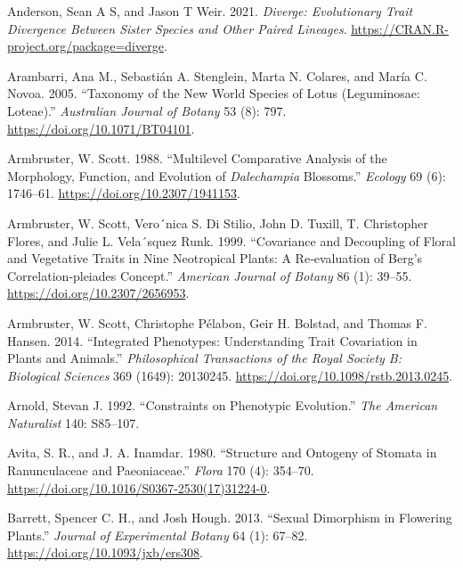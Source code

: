 \documentclass[
  12pt,
]{article}
\newlength{\cslhangindent}
\newlength{\cslentryspacingunit} %
\newenvironment{CSLReferences}[2] %
 {%
  \setlength{\parindent}{0pt}
  \ifodd #1
  \let\oldpar\par
  \def\par{\hangindent=\cslhangindent\oldpar}
  \fi
  \setlength{\parskip}{#2\cslentryspacingunit}
 }%
 {}
\begin{document}
\hypertarget{refs}{}
\begin{CSLReferences}{1}{0}
\leavevmode{}%
Anderson, Sean A S, and Jason T Weir. 2021. \emph{Diverge: {Evolutionary} {Trait} {Divergence} {Between} {Sister} {Species} and {Other} {Paired} {Lineages}}. \url{https://CRAN.R-project.org/package=diverge}.

\leavevmode{}%
Arambarri, Ana M., Sebastián A. Stenglein, Marta N. Colares, and María C. Novoa. 2005. {``Taxonomy of the {New} {World} Species of {Lotus} ({Leguminosae}: {Loteae}).''} \emph{Australian Journal of Botany} 53 (8): 797. \url{https://doi.org/10.1071/BT04101}.

\leavevmode{}%
Armbruster, W. Scott. 1988. {``Multilevel {Comparative} {Analysis} of the {Morphology}, {Function}, and {Evolution} of \emph{Dalechampia} {Blossoms}.''} \emph{Ecology} 69 (6): 1746--61. \url{https://doi.org/10.2307/1941153}.

\leavevmode{}%
Armbruster, W. Scott, Vero´nica S. Di Stilio, John D. Tuxill, T. Christopher Flores, and Julie L. Vela´squez Runk. 1999. {``Covariance and Decoupling of Floral and Vegetative Traits in Nine {Neotropical} Plants: A Re‐evaluation of {Berg}'s Correlation‐pleiades Concept.''} \emph{American Journal of Botany} 86 (1): 39--55. \url{https://doi.org/10.2307/2656953}.

\leavevmode{}%
Armbruster, W. Scott, Christophe Pélabon, Geir H. Bolstad, and Thomas F. Hansen. 2014. {``Integrated Phenotypes: Understanding Trait Covariation in Plants and Animals.''} \emph{Philosophical Transactions of the Royal Society B: Biological Sciences} 369 (1649): 20130245. \url{https://doi.org/10.1098/rstb.2013.0245}.

\leavevmode{}%
Arnold, Stevan J. 1992. {``Constraints on Phenotypic Evolution.''} \emph{The American Naturalist} 140: S85--107.

\leavevmode{}%
Avita, S. R., and J. A. Inamdar. 1980. {``Structure and {Ontogeny} of {Stomata} in {Ranunculaceae} and {Paeoniaceae}.''} \emph{Flora} 170 (4): 354--70. \url{https://doi.org/10.1016/S0367-2530(17)31224-0}.

\leavevmode{}%
Barrett, Spencer C. H., and Josh Hough. 2013. {``Sexual Dimorphism in Flowering Plants.''} \emph{Journal of Experimental Botany} 64 (1): 67--82. \url{https://doi.org/10.1093/jxb/ers308}.


\end{CSLReferences}
\end{document}
